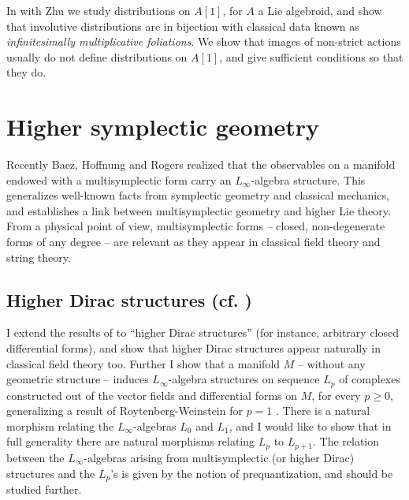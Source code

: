 \documentclass[11pt]{amsart}
\begin{document}
In \cite{ZZL2} with Zhu we study  distributions on $A[1]$, for $A$ a Lie algebroid, and show that involutive distributions are in bijection with classical data  known as \emph{infinitesimally multiplicative foliations}. We show that
 images of non-strict actions usually do not define distributions on $A[1]$, and give sufficient conditions so that they do. 
 
 
\section{Higher symplectic geometry}


Recently Baez, Hoffnung and Rogers  \cite{BHR} realized  that the observables on a manifold endowed with a multisymplectic form  carry an $L_{\infty}$-algebra structure. This generalizes well-known facts from symplectic geometry and classical mechanics, and  establishes a link between multisymplectic geometry and higher Lie theory. From a physical point of view, multisymplectic forms
-- closed, non-degenerate forms of any degree -- are relevant as they appear in  classical field theory and string theory.

\subsection{Higher Dirac structures (cf. \cite{HDirac})}
I extend the results of \cite{BHR} to ``higher Dirac structures'' (for instance, arbitrary closed differential forms), and   show that higher Dirac structures appear naturally in classical field theory too.
Further I show that a manifold $M$ -- without any geometric structure -- induces $L_{\infty}$-algebra structures on  sequence $L_p$ of  complexes constructed out of the vector fields and differential forms on $M$, for every $p\ge 0$, generalizing a result of Roytenberg-Weinstein for $p=1$ \cite{rw}. There is a natural morphism relating the $L_{\infty}$-algebras $L_0$ and $L_1$, and 
 I would like to show  that in full generality  there are natural morphisms relating $L_p$ to $L_{p+1}$. The relation between the $L_{\infty}$-algebras arising from multisymplectic (or higher Dirac) structures and the $L_p$'s  is given by the notion of prequantization, and should be studied further.
 
\end{document}
